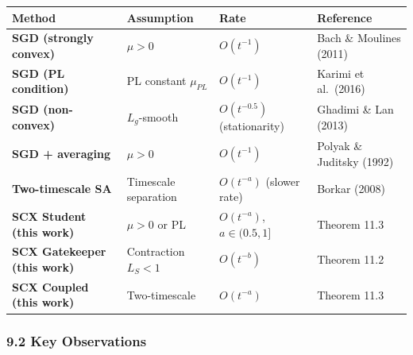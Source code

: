 \documentclass[
  12pt,
]{article}
\begin{document}
\begin{longtable}[]{@{}
  >{\raggedright\arraybackslash}p{}
  >{\raggedright\arraybackslash}p{}
  >{\raggedright\arraybackslash}p{}
  >{\raggedright\arraybackslash}p{}@{}}
\toprule\noalign{}
\begin{minipage}[b]{\linewidth}\raggedright
Method
\end{minipage} & \begin{minipage}[b]{\linewidth}\raggedright
Assumption
\end{minipage} & \begin{minipage}[b]{\linewidth}\raggedright
Rate
\end{minipage} & \begin{minipage}[b]{\linewidth}\raggedright
Reference
\end{minipage} \\
\midrule\noalign{}
\endhead
\bottomrule\noalign{}
\endlastfoot
\textbf{SGD (strongly convex)} & \(\mu > 0\) & \(O(t^{-1})\) & Bach \&
Moulines (2011) \\
\textbf{SGD (PL condition)} & PL constant \(\mu_{PL}\) & \(O(t^{-1})\) &
Karimi et al.~(2016) \\
\textbf{SGD (non-convex)} & \(L_g\)-smooth & \(O(t^{-0.5})\)
(stationarity) & Ghadimi \& Lan (2013) \\
\textbf{SGD + averaging} & \(\mu > 0\) & \(O(t^{-1})\) & Polyak \&
Juditsky (1992) \\
\textbf{Two-timescale SA} & Timescale separation & \(O(t^{-a})\) (slower
rate) & Borkar (2008) \\
\textbf{SCX Student (this work)} & \(\mu > 0\) or PL & \(O(t^{-a})\),
\(a \in (0.5, 1]\) & Theorem 11.3 \\
\textbf{SCX Gatekeeper (this work)} & Contraction \(L_S < 1\) &
\(O(t^{-b})\) & Theorem 11.2 \\
\textbf{SCX Coupled (this work)} & Two-timescale & \(O(t^{-a})\) &
Theorem 11.3 \\
\end{longtable}

\subsubsection{9.2 Key Observations}\label{key-observations}
\end{document}
